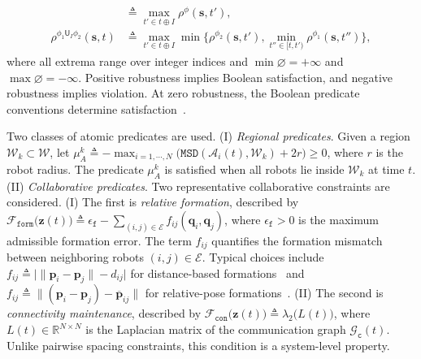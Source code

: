 \begin{revision}
\begin{equation}
\begin{aligned}
&\triangleq \max_{t'\in t\oplus I}\rho^\phi(\mathbf{s},t'), \\
\rho^{\phi_1\mathsf{U}_I\phi_2}(\mathbf{s},t)
&\triangleq \max_{t'\in t\oplus I}
\min\Big\{\rho^{\phi_2}(\mathbf{s},t'),
\min_{t''\in [t,t')}\rho^{\phi_1}(\mathbf{s},t'')\Big\},
\end{aligned}
\end{equation}
where all extrema range over integer indices and
$\min\varnothing=+\infty$ and $\max\varnothing=-\infty$.
Positive robustness implies Boolean satisfaction, and negative robustness
implies violation. At zero robustness, the Boolean predicate conventions
determine satisfaction~\citep{fainekos2009robustness,donze2010robust}.
\end{revision}


Two classes of atomic predicates are used.
(I) \emph{Regional predicates}.
Given a region $\mathcal{W}_k\subset\mathcal{W}$, let
$\mu_A^k\triangleq
-\max_{i=1,\cdots,N}\big(
\texttt{MSD}(\mathcal{A}_i(t),\mathcal{W}_k)+2r\big)\geq 0$,
where $r$ is the robot radius.
The predicate $\mu_A^k$ is satisfied when all robots lie inside
$\mathcal{W}_k$ at time $t$.
(II) \emph{Collaborative predicates}.
Two representative collaborative constraints are considered.
(I) The first is \emph{relative formation}, described by
$\mathcal{F}_{\texttt{form}}\big(\mathbf{z}(t)\big)\triangleq
\epsilon_{\texttt{f}}-\sum_{(i,j)\in\mathcal{E}}
f_{ij}(\mathbf{q}_i,\mathbf{q}_j)$,
where $\epsilon_{\texttt{f}}>0$ is the maximum admissible formation error.
The term $f_{ij}$ quantifies the formation mismatch between neighboring
robots $(i,j)\in\mathcal{E}$.
Typical choices include
$f_{ij}\triangleq \big|\|\mathbf{p}_i-\mathbf{p}_j\|-d_{ij}\big|$
for distance-based formations~\citep{antonelli2014decentralized} and
$f_{ij}\triangleq
\|(\mathbf{p}_i-\mathbf{p}_j)-\overline{\mathbf{p}}_{ij}\|$
for relative-pose formations~\citep{alonso2017multi}.
(II) The second is \emph{connectivity maintenance}, described by
$\mathcal{F}_{\texttt{con}}\big(\mathbf{z}(t)\big)\triangleq
\lambda_2\big(L(t)\big)$,
where $L(t)\in\mathbb{R}^{N\times N}$ is the Laplacian matrix of the
communication graph $\mathcal{G}_{\texttt{c}}(t)$.
Unlike pairwise spacing constraints, this condition is a system-level
property.

